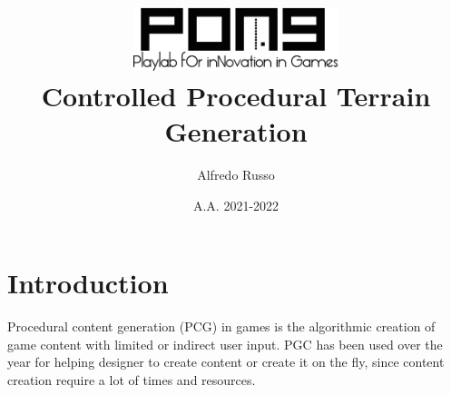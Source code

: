 \documentclass[12pt]{article}
\begin{document}
    \title{\includegraphics[width=6cm]{images/Pong}\\[2cm]Controlled Procedural Terrain Generation}
    \author{Alfredo Russo}
    \date{A.A. 2021-2022}
    
    \maketitle
    \newpage
    
    \tableofcontents
    \newpage
    

    \section{Introduction}



    Procedural content generation (PCG) in games is the algorithmic creation of game content with limited or indirect user input. PGC has been used over the year 
    for helping designer to create content or create it on the fly, since content creation require a lot of times and resources.
\end{document}
